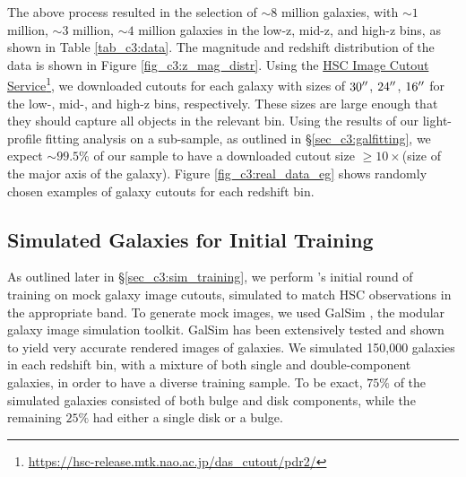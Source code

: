 The above process resulted in the selection of $\sim 8$ million galaxies, with $\sim1$ million, $\sim3$ million, $\sim4$ million galaxies in the low-z, mid-z, and high-z bins, as shown in Table \ref{tab_c3:data}. The magnitude and redshift distribution of the data is shown in Figure \ref{fig_c3:z_mag_distr}. Using the \href{https://hsc-release.mtk.nao.ac.jp/das_cutout/pdr2/}{HSC Image Cutout Service}\footnote{\href{https://hsc-release.mtk.nao.ac.jp/das_cutout/pdr2/}{https://hsc-release.mtk.nao.ac.jp/das\_cutout/pdr2/}}, we downloaded cutouts for each galaxy with sizes of $30\mbox{$^{\prime\prime}$}$, $24\mbox{$^{\prime\prime}$}$, $16\mbox{$^{\prime\prime}$}$ for the low-, mid-, and high-z bins, respectively. These sizes are large enough that they should capture all objects in the relevant bin. Using the results of our light-profile fitting analysis on a sub-sample, as outlined in \S \ref{sec_c3:galfitting}, we expect $\sim99.5\%$ of our sample to have a downloaded cutout size $\geq10\times$(size of the major axis of the galaxy). Figure \ref{fig_c3:real_data_eg} shows randomly chosen examples of galaxy cutouts for each redshift bin. 



\subsection{Simulated Galaxies for Initial Training} \label{sec_c3:sim_data}

As outlined later in \S \ref{sec_c3:sim_training}, we perform \gampen{}'s initial round of training on mock galaxy image cutouts, simulated to match HSC observations in the appropriate band. To generate mock images, we used GalSim \citep{Rowe2015GalSim:Toolkit}, the modular galaxy image simulation toolkit. GalSim has been extensively tested and shown to yield very accurate rendered images of galaxies. We simulated 150,000 galaxies in each redshift bin, with a mixture of both single and double-component galaxies, in order to have a diverse training sample. To be exact, $75\%$ of the simulated galaxies consisted of both bulge and disk components, while the remaining $25\%$ had either a single disk or a bulge.


